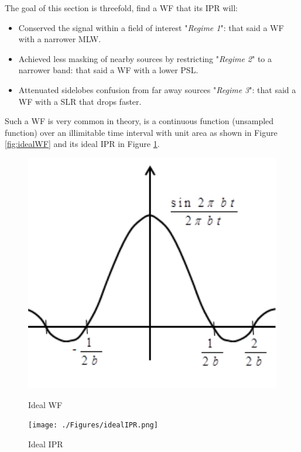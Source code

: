 \documentclass[useAMS,usenatbib]{mn2e}
\begin{document}
The goal of this section is threefold, find a WF that its IPR will:
\begin{itemize}
  \item Conserved the signal within a field of interest "\textit{Regime 1}": that said a WF with a narrower MLW.
  \item Achieved less masking of nearby sources by restricting "\textit{Regime 2}" to a narrower band: that said a WF with a lower PSL.
  \item Attenuated sidelobes confusion from far away sources "\textit{Regime 3}": that said a WF with a SLR that drops faster.
\end{itemize}
Such a WF is very common in theory, is a continuous 
function (unsampled function) over an illimitable time interval with unit area as shown in Figure \ref{fig:idealWF} and its ideal IPR in 
Figure \ref{fig:idealIRF}. 
\begin{figure}
\begin{minipage}{0.4\linewidth}\includegraphics[width=1.1\textwidth]{./Figures/idealsinc.png}\caption{Ideal 
WF}\label{fig:idealWF}
\end{minipage}
  \hspace{1cm} 
\begin{minipage}{0.38\linewidth}\texttt{[image: ./Figures/idealIPR.png]}\caption{Ideal 
IPR}\label{fig:idealIRF}\end{minipage}
\end{figure}
\end{document}
